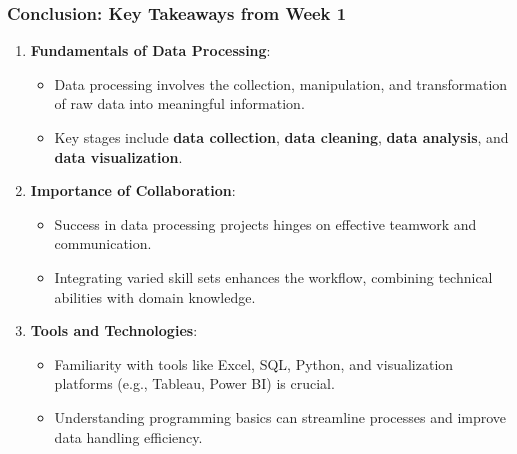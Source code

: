 \documentclass{beamer}
\begin{document}
\begin{frame}[fragile]
    \frametitle{Conclusion: Key Takeaways from Week 1}
    \begin{enumerate}
        \item \textbf{Fundamentals of Data Processing}:
        \begin{itemize}
            \item Data processing involves the collection, manipulation, and transformation of raw data into meaningful information.
            \item Key stages include \textbf{data collection}, \textbf{data cleaning}, \textbf{data analysis}, and \textbf{data visualization}.
        \end{itemize}
        
        \item \textbf{Importance of Collaboration}:
        \begin{itemize}
            \item Success in data processing projects hinges on effective teamwork and communication.
            \item Integrating varied skill sets enhances the workflow, combining technical abilities with domain knowledge.
        \end{itemize}
        
        \item \textbf{Tools and Technologies}:
        \begin{itemize}
            \item Familiarity with tools like Excel, SQL, Python, and visualization platforms (e.g., Tableau, Power BI) is crucial.
            \item Understanding programming basics can streamline processes and improve data handling efficiency.
        \end{itemize}
    \end{enumerate}
\end{frame}
\end{document}
